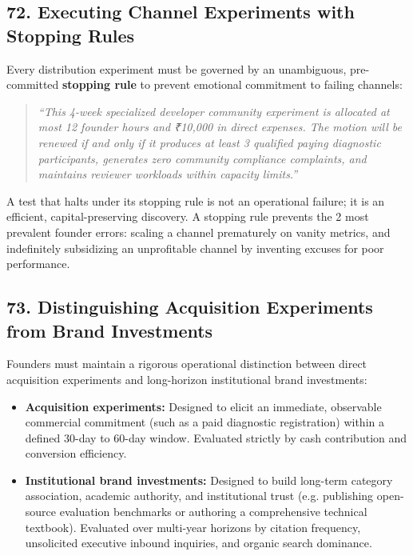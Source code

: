 \subsection*{72. Executing Channel Experiments with Stopping Rules}

Every distribution experiment must be governed by an unambiguous, pre-committed \textbf{stopping rule} to prevent emotional commitment to failing channels:
\begin{quote}
\textit{``This 4-week specialized developer community experiment is allocated at most 12 founder hours and ₹10,000 in direct expenses. The motion will be renewed if and only if it produces at least 3 qualified paying diagnostic participants, generates zero community compliance complaints, and maintains reviewer workloads within capacity limits.''}
\end{quote}

A test that halts under its stopping rule is not an operational failure; it is an efficient, capital-preserving discovery. A stopping rule prevents the 2 most prevalent founder errors: scaling a channel prematurely on vanity metrics, and indefinitely subsidizing an unprofitable channel by inventing excuses for poor performance.

\subsection*{73. Distinguishing Acquisition Experiments from Brand Investments}

Founders must maintain a rigorous operational distinction between direct acquisition experiments and long-horizon institutional brand investments:
\begin{itemize}[leftmargin=*,itemsep=1pt]
  \item \textbf{Acquisition experiments:} Designed to elicit an immediate, observable commercial commitment (such as a paid diagnostic registration) within a defined 30-day to 60-day window. Evaluated strictly by cash contribution and conversion efficiency.
  \item \textbf{Institutional brand investments:} Designed to build long-term category association, academic authority, and institutional trust (e.g. publishing open-source evaluation benchmarks or authoring a comprehensive technical textbook). Evaluated over multi-year horizons by citation frequency, unsolicited executive inbound inquiries, and organic search dominance.
\end{itemize}

